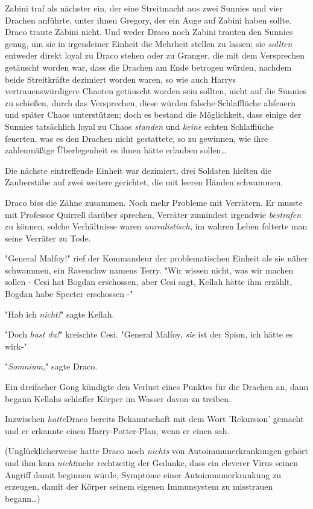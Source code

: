 {Zabini traf als nächster ein, der eine Streitmacht aus zwei Sunnies und vier Drachen anführte, unter ihnen Gregory, der ein Auge auf Zabini haben sollte. Draco traute Zabini nicht. Und weder Draco noch Zabini trauten den Sunnies genug, um sie in irgendeiner Einheit die Mehrheit stellen zu lassen; sie \emph{sollten} entweder direkt loyal zu Draco stehen oder zu Granger, die mit dem Versprechen getäuscht worden war, dass die Drachen am Ende betrogen würden, nachdem beide Streitkräfte dezimiert worden waren, so wie auch Harrys vertrauenswürdigere Chaoten getäuscht worden sein sollten, nicht auf die Sunnies zu schießen, durch das Versprechen, diese würden falsche Schlafflüche abfeuern und später Chaos unterstützen; doch es bestand die Möglichkeit, dass einige der Sunnies tatsächlich loyal zu Chaos \emph{standen} und \emph{keine} echten Schlafflüche feuerten, was es den Drachen nicht gestattete, so zu gewinnen, wie ihre zahlenmäßige Überlegenheit es ihnen hätte erlauben sollen…

Die nächste eintreffende Einheit war dezimiert, drei Soldaten hielten die Zauberstäbe auf zwei weitere gerichtet, die mit leeren Händen schwammen.

Draco biss die Zähne zusammen. Noch mehr Probleme mit Verrätern. Er musste mit Professor Quirrell darüber sprechen, Verräter zumindest irgendwie \emph{bestrafen} zu können, solche Verhältnisse waren \emph{unrealistisch,} im wahren Leben folterte man seine Verräter zu Tode.

"General Malfoy!" rief der Kommandeur der problematischen Einheit als sie näher schwammen, ein Ravenclaw namens Terry. "Wir wissen nicht, was wir machen sollen - Cesi hat Bogdan erschossen, aber Cesi sagt, Kellah hätte ihm erzählt, Bogdan habe Specter erschossen -"

"Hab ich \emph{nicht!}" sagte Kellah.

"Doch \emph{hast du!}" kreischte Cesi. "General Malfoy, \emph{sie} ist der Spion, ich hätte es wirk-"

"\emph{Somnium,}" sagte Draco.

Ein dreifacher Gong kündigte den Verlust eines Punktes für die Drachen an, dann begann Kellahs schlaffer Körper im Wasser davon zu treiben.

Inzwischen \emph{hatte}Draco bereits Bekanntschaft mit dem Wort 'Rekursion' gemacht und er erkannte einen Harry-Potter-Plan, wenn er einen sah.

(Unglücklicherweise hatte Draco noch \emph{nichts} von Autoimmunerkrankungen gehört und ihm kam \emph{nicht}mehr rechtzeitig der Gedanke, dass ein cleverer Virus seinen Angriff damit beginnen würde, Symptome einer Autoimmunerkrankung zu erzeugen, damit der Körper seinem eigenen Immunsystem zu misstrauen begann…)

}
